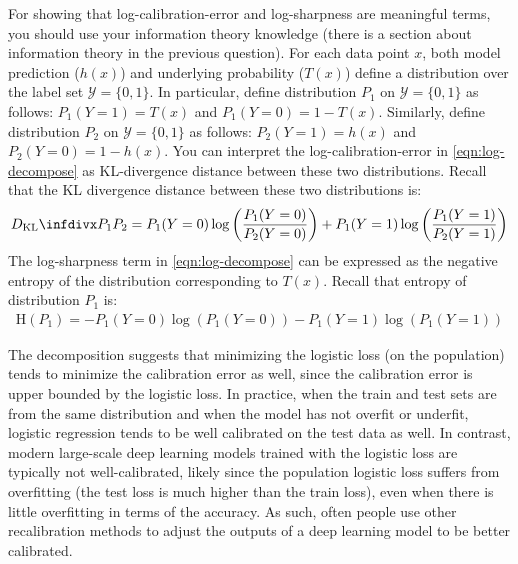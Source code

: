 For showing that log-calibration-error and log-sharpness are meaningful terms, you should use your information theory knowledge (there is a section about information theory in the previous question).
%
For each data point $x$, both model prediction ($h(x)$) and underlying probability ($T(x)$) define a distribution over the label set $\mathcal{Y} = \{0,1\}$.
In particular, define distribution $P_1$ on $\mathcal{Y}=\{0,1\}$ as follows:
$P_1(Y=1) = T(x)$ and $P_1(Y=0) = 1-T(x)$. 
Similarly, define distribution $P_2$ on $\mathcal{Y}=\{0,1\}$ as follows: $P_2(Y=1) = h(x)$ and $P_2(Y=0) = 1-h(x)$. 
You can interpret the log-calibration-error in \eqref{eqn:log-decompose} as KL-divergence distance between these two distributions. 
Recall that the KL divergence distance between these two distributions is:
\begin{align}
	\infdiv{P_1}{P_2} = P_1(Y=0) \log\left(\frac{P_1(Y=0)}{P_2(Y=0)}\right) + P_1(Y=1) \log\left(\frac{P_1(Y=1)}{P_2(Y=1)}\right) 
\end{align} 
The log-sharpness term in \eqref{eqn:log-decompose} can be expressed as the negative entropy of the distribution corresponding to $T(x)$. 
Recall that entropy of distribution $P_1$ is:
\begin{align}
	\text {H}(P_1) = -P_1(Y=0)\log(P_1(Y=0)) - P_1(Y=1)\log(P_1(Y=1))
\end{align}

The decomposition suggests that minimizing the logistic loss (on the population) tends to minimize the calibration error as well, since the calibration error is upper bounded by the logistic loss. In practice, when the train and test sets are from the same distribution and when the model has not overfit or underfit, logistic regression tends to be well calibrated on the test data as well.  In contrast, modern large-scale deep learning models trained with the logistic loss are typically not well-calibrated, likely since the population  logistic loss suffers from overfitting (the test loss is much higher than the train loss), even when there is little overfitting in terms of the accuracy. As such, often people use other recalibration methods to adjust the outputs of a deep learning model to be better calibrated.
